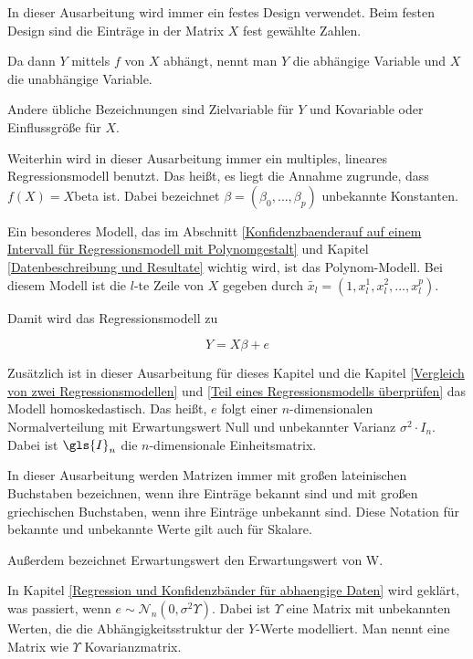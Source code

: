 \documentclass[12pt,a4paper]{article}
\theoremstyle{definition}
\theoremstyle{definition}
\theoremstyle{definition}
\theoremstyle{definition}
\begin{document}
In dieser Ausarbeitung wird immer ein festes Design verwendet. Beim festen Design sind die Einträge in der Matrix $X$ fest gewählte Zahlen.

Da dann $Y$ mittels $f$ von $X$ abhängt, nennt man $Y$ die abhängige Variable und $X$ die unabhängige Variable. 

Andere übliche Bezeichnungen sind Zielvariable für $Y$ und Kovariable oder Einflussgröße für $X$.

Weiterhin wird in dieser Ausarbeitung immer ein multiples, lineares Regressionsmodell benutzt. Das heißt, es liegt die Annahme zugrunde, dass $f(X) = X $\gls{beta} ist. Dabei bezeichnet $\beta = (\beta_{0}, \ldots, \beta_{p})$ unbekannte Konstanten. 

Ein besonderes Modell, das im Abschnitt \ref{Konfidenzbaenderauf auf einem Intervall für Regressionsmodell mit Polynomgestalt} und Kapitel \ref{Datenbeschreibung und Resultate} wichtig wird, ist das Polynom-Modell. Bei diesem Modell ist die $l$-te Zeile von $X$ gegeben durch $\tilde{x_l} = (1, x_{l}^1, x_{l}^2, \ldots, x_{l}^p)$.

Damit wird das Regressionsmodell zu

\begin{equation}
Y = X \beta + e \label{Grundmodell_Regression}
\end{equation}

Zusätzlich ist in dieser Ausarbeitung für dieses Kapitel und die Kapitel \ref{Vergleich von zwei Regressionsmodellen} und \ref{Teil eines Regressionsmodells überprüfen} das Modell homoskedastisch. Das heißt, $e$ folgt einer $n$-dimensionalen Normalverteilung mit Erwartungswert Null und unbekannter Varianz $\sigma^2 \cdot I_n$. Dabei ist $\gls{I}_n$ die $n$-dimensionale Einheitsmatrix. 

In dieser Ausarbeitung werden \gls{Matrizen} immer mit großen lateinischen Buchstaben bezeichnen, wenn ihre Einträge bekannt sind und mit großen griechischen Buchstaben, wenn ihre Einträge unbekannt sind. Diese Notation für bekannte und unbekannte Werte gilt auch für Skalare. 

Außerdem bezeichnet \gls{Erwartungswert} den Erwartungswert von W.

In Kapitel \ref{Regression und Konfidenzbänder für abhaengige Daten} wird geklärt, was passiert, wenn $e \sim \mathscr{N}_{n}(0,\sigma^2 \Upsilon)$. Dabei ist $\Upsilon$ eine Matrix mit unbekannten Werten, die die Abhängigkeitsstruktur der $Y$-Werte modelliert. Man nennt eine Matrix wie $\Upsilon$ Kovarianzmatrix.
\end{document}
